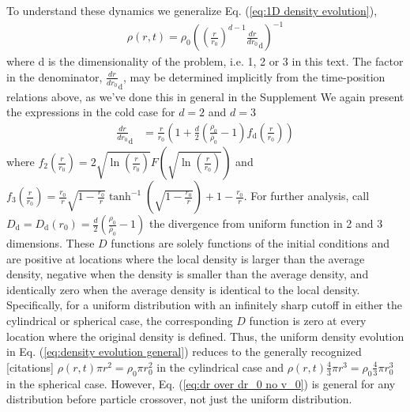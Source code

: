 \documentclass[aps,prl,twocolumn,showpacs,superscriptaddress,groupedaddress]{revtex4-1}  %
\begin{document}
{To understand these dynamics we generalize Eq. (\ref{eq:1D density evolution}), 
\begin{align}
  \rho(r,t) = \rho_0 \left( \left(\frac{r}{r_0}\right)^{d-1} {\frac{dr}{dr_0}}_\text{d}\right)^{-1}\label{eq:density evolution general}
\end{align}
where d is the dimensionality of the problem, i.e. 1, 2 or 3 in this text.
The factor in the denominator, ${\frac{dr}{dr_0}}_\text{d}$, may be 
determined implicitly from the time-position relations above, as we've done this in general in the Supplement
We again present the expressions in the cold case for $d=2$ and $d=3$
\begin{align}
  \frac{d r}{dr_0}_\text{d} &= \frac{r}{r_0} \left(1 + \frac{d}{2} \left(\frac{\rho_0}{\bar{\rho}_0} - 1\right) f_\text{d}\left(\frac{r}{r_0}\right)\right)\label{eq:dr over dr_0 no v_0}
\end{align}
where $ f_\text{2}\left(\frac{r}{r_0}\right) = 2  \sqrt{\ln\left(\frac{r}{r_0}\right)}F\left(\sqrt{\ln\left(\frac{r}{r_0}\right)}\right)$ and
$f_\text{3}\left(\frac{r}{r_0}\right) = \frac{r_0}{r} \sqrt{1 - \frac{r_0}{r}} \tanh^{-1}(\sqrt{1 - \frac{r_0}{r}}) + 1 - \frac{r_0}{r}$.  For further analysis, call
$D_\text{d} = D_\text{d}(r_0) = \frac{d}{2} \left(\frac{\rho_0}{\bar{\rho}_0} - 1\right)$ the divergence from uniform function in 2 and 3 dimensions.
These $D$ functions are solely functions of the initial conditions and are positive at locations where the local density is larger than the average density, negative when the density
is smaller than the average density, and identically zero when the average density is identical to the local density. 
Specifically, for a uniform distribution with an infinitely sharp cutoff in either the cylindrical or spherical case, the 
corresponding $D$ function is zero at every location where the original density is defined.  Thus, the uniform density evolution
in Eq. (\ref{eq:density evolution general})
reduces to the generally recognized [citations] $\rho(r,t) \pi r^2=  \rho_0 \pi r_0^2$ in the cylindrical case and $\rho(r,t) \frac{4}{3} \pi r^3=  \rho_0 \frac{4}{3} \pi r_0^3$ in
the spherical case.  However, Eq. (\ref{eq:dr over dr_0 no v_0})
is general for any distribution before particle crossover, not just the uniform distribution.

}
\end{document}
